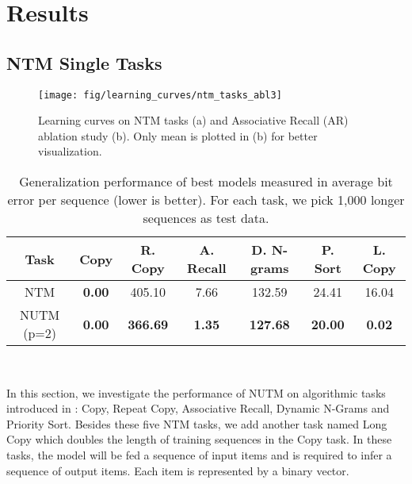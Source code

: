 \documentclass[english]{article}
\providecommand{\tabularnewline}{\\}
\begin{document}
\section{Results}


\subsection{NTM Single Tasks\label{subsec:NTM-Single-Tasks}}

\begin{figure}
\begin{centering}
\texttt{[image: fig/learning\_curves/ntm\_tasks\_abl3]}
\par\end{centering}
\caption{Learning curves on NTM tasks (a) and Associative Recall (AR) ablation
study (b). Only mean is plotted in (b) for better visualization.\label{fig:Learning-curves-on}}
\end{figure}
\begin{table}
\begin{centering}
\begin{tabular}{c|cccccc}
\hline 
Task & Copy & R. Copy & A. Recall & D. N-grams & P. Sort & L. Copy\tabularnewline
\hline 
NTM & \textbf{0.00} & 405.10 & 7.66 & 132.59 & 24.41 & 16.04\tabularnewline
NUTM (p=2) & \textbf{0.00} & \textbf{366.69} & \textbf{1.35} & \textbf{127.68} & \textbf{20.00} & \textbf{0.02}\tabularnewline
\hline 
\end{tabular}
\par\end{centering}
~

\caption{Generalization performance of best models measured in average bit
error per sequence (lower is better). For each task, we pick 1,000
longer sequences as test data. \label{tab:Generalisation-performance-of}}
\end{table}
In this section, we investigate the performance of NUTM on algorithmic
tasks introduced in \citet{graves2014neural} : Copy, Repeat Copy,
Associative Recall, Dynamic N-Grams and Priority Sort. Besides these
five NTM tasks, we add another task named Long Copy which doubles
the length of training sequences in the Copy task. In these tasks,
the model will be fed a sequence of input items and is required to
infer a sequence of output items. Each item is represented by a binary
vector.
\end{document}
